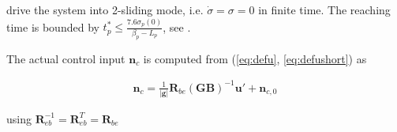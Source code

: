 \documentclass{ifacconf}
\providecommand{\mbf}[1]{\mathbf{#1}}
\newcommand{\idxAxis}{{\ensuremath{p}}}
\begin{document}
 drive the system into 2-sliding mode, i.e. $\dot{\sigma} = \sigma = 0$ in finite time. The reaching time is bounded by $t_\idxAxis^* \leq \frac{7.6 \sigma_\idxAxis(0)}{\beta_\idxAxis - L_\idxAxis}$, see \cite{galzi2006uav}.

The actual control input $\mbf{n}_c$ is computed from (\ref{eq:defu}, \ref{eq:defushort}) as

\begin{align}
\mbf{n}_c = \frac{1}{|\mbf{g}|} \mbf{R}_{be}(\mbf{GB})^{-1} \mbf{u}' + \mbf{n}_{c,0}
\end{align}

using $\mbf{R}_{eb}^{-1} = \mbf{R}_{eb}^{T} = \mbf{R}_{be}$

%
%
%
%
%
%
%

%
\end{document}
